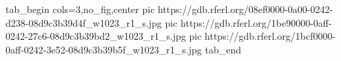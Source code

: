  
 
 
 
 

\ifcmt
  tab_begin cols=3,no_fig,center
     pic https://gdb.rferl.org/08ef0000-0a00-0242-d238-08d9c3b39d4f_w1023_r1_s.jpg
		 pic https://gdb.rferl.org/1be90000-0aff-0242-27c6-08d9c3b39bd2_w1023_r1_s.jpg
		 pic https://gdb.rferl.org/1bcf0000-0aff-0242-3e52-08d9c3b39b5f_w1023_r1_s.jpg
  tab_end
\fi
